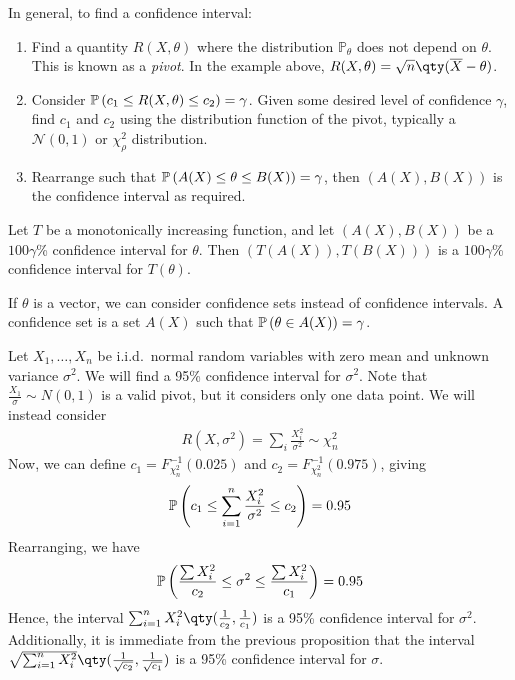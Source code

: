 \begin{remark}
	In general, to find a confidence interval:
	\begin{enumerate}
		\item Find a quantity $R(X,\theta)$ where the distribution $\mathbb P_\theta$ does not depend on $\theta$.
		      This is known as a \textit{pivot}.
		      In the example above, $R(X,\theta) = \sqrt{n}\qty(\overline X - \theta)$.
		\item Consider $\mathbb{P}\left({c_1 \leq R(X,\theta) \leq c_2}\right) = \gamma$.
		      Given some desired level of confidence $\gamma$, find $c_1$ and $c_2$ using the distribution function of the pivot, typically a $\mathcal{N}(0,1)$ or $\chi^2_\rho$ distribution.
		\item Rearrange such that $\mathbb{P}\left({A(X) \leq \theta \leq B(X)}\right) = \gamma$, then $(A(X), B(X))$ is the confidence interval as required.
	\end{enumerate}
\end{remark}

\begin{proposition}
	Let $T$ be a monotonically increasing function, and let $(A(X), B(X))$ be a $100 \gamma$\% confidence interval for $\theta$.
	Then $(T(A(X)), T(B(X)))$ is a $100 \gamma$\% confidence interval for $T(\theta)$.
\end{proposition}

\begin{remark}
	If $\theta$ is a vector, we can consider confidence sets instead of confidence intervals.
	A confidence set is a set $A(X)$ such that $\mathbb{P}\left({\theta \in A(X)}\right) = \gamma$.
\end{remark}

\begin{example}
	Let $X_1, \dots, X_n$ be i.i.d.\ normal random variables with zero mean and unknown variance $\sigma^2$.
	We will find a 95\% confidence interval for $\sigma^2$.
	Note that $\frac{X_1}{\sigma} \sim N(0,1)$ is a valid pivot, but it considers only one data point.
	We will instead consider
	\begin{align*}
		R(X, \sigma^2) = \sum_i \frac{X_i^2}{\sigma^2} \sim \chi^2_n
	\end{align*}
	Now, we can define $c_1 = F_{\chi^2_n}^{-1}(0.025)$ and $c_2 = F_{\chi^2_n}^{-1}(0.975)$, giving
	\begin{align*}
		\mathbb{P}\left({c_1 \leq \sum_{i=1}^n \frac{X_i^2}{\sigma^2} \leq c_2}\right) = 0.95
	\end{align*}
	Rearranging, we have
	\begin{align*}
		\mathbb{P}\left({\frac{\sum X_i^2}{c_2} \leq \sigma^2 \leq \frac{\sum X_i^2}{c_1}}\right) = 0.95
	\end{align*}
	Hence, the interval $\sum_{i=1}^n X_i^2 \qty(\frac{1}{c_2}, \frac{1}{c_1})$ is a 95\% confidence interval for $\sigma^2$.
	Additionally, it is immediate from the previous proposition that the interval $\sqrt{\sum_{i=1}^n X_i^2} \qty(\frac{1}{\sqrt{c_2}}, \frac{1}{\sqrt{c_1}})$ is a 95\% confidence interval for $\sigma$.
\end{example}

